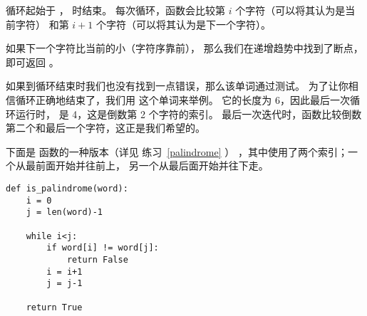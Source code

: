 
循环起始于  ，  时结束。
每次循环，函数会比较第 $i$ 个字符（可以将其认为是当前字符）
和第 $i+1$ 个字符（可以将其认为是下一个字符）。


如果下一个字符比当前的小（字符序靠前），
那么我们在递增趋势中找到了断点，即可返回  。


如果到循环结束时我们也没有找到一点错误，那么该单词通过测试。
为了让你相信循环正确地结束了，我们用  这个单词来举例。
它的长度为 6，因此最后一次循环运行时， 是 4，这是倒数第 2 个字符的索引。
最后一次迭代时，函数比较倒数第二个和最后一个字符，这正是我们希望的。


下面是  函数的一种版本（详见 练习~\ref{palindrome} ）
，其中使用了两个索引；一个从最前面开始并往前上， 另一个从最后面开始并往下走。

\begin{lstlisting}
def is_palindrome(word):
    i = 0
    j = len(word)-1

    while i<j:
        if word[i] != word[j]:
            return False
        i = i+1
        j = j-1

    return True
\end{lstlisting}



